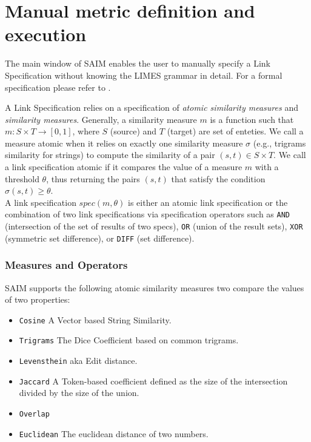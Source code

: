 \documentclass[oneside,a4paper,12pt]{memoir}
\begin{document}
\chapter{Manual metric definition and execution}
\label{manual}
The main window of SAIM enables the user to manually specify a Link Specification without knowing the LIMES grammar in detail. For a formal specification please refer to \cite{NGLY12}.

A Link Specification relies on a specification of \emph{atomic similarity measures} and \emph{similarity measures}. Generally, a similarity measure $m$ is a function such that $m: S \times T \rightarrow [0, 1]$, where $S$ (source) and $T$ (target) are set of enteties. We call a measure atomic when it relies on exactly one similarity measure $\sigma$ (e.g., trigrams similarity for strings) to compute the similarity of a pair $(s, t) \in S \times T$.
We call a link specification atomic if it compares the value of a measure $m$ with a threshold $\theta$, thus returning the pairs $(s, t)$ that satisfy the condition $\sigma(s, t) \geq \theta$.\\  
A link specification $spec(m, \theta)$ is either an atomic link specification or the combination of two link specifications via specification operators such as \texttt{AND} (intersection of the set of results of two specs), \texttt{OR} (union of the result sets), \texttt{XOR} (symmetric set difference), or \texttt{DIFF} (set difference).

\subsection{Measures and Operators}
SAIM supports the following atomic similarity measures two compare the values of two properties: 

\begin{itemize}
	\item \texttt{Cosine} A Vector based String Similarity.
	\item \texttt{Trigrams} The Dice Coefficient based on common trigrams.
	\item \texttt{Levensthein} aka Edit distance.
	\item \texttt{Jaccard} A Token-based coefficient defined as the size of the intersection divided by the size of the union.
	\item \texttt{Overlap}
	\item \texttt{Euclidean} The euclidean distance of two numbers.
\end{itemize}
\end{document}

